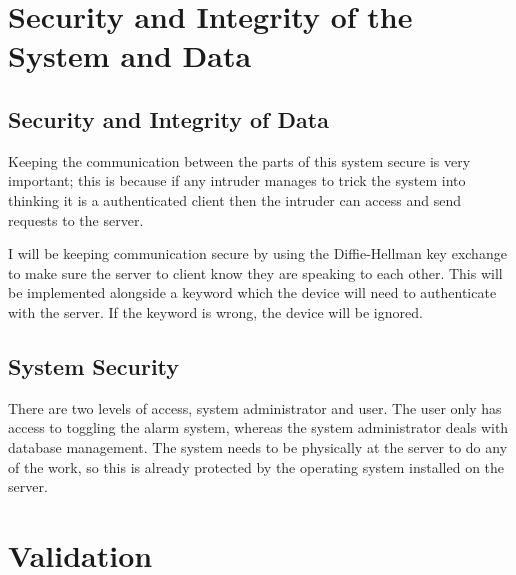 \documentclass[12pt,a4paper]{report}
\begin{document}
\bigskip

\section[Security and Integrity of the System and Data]{Security and Integrity of the System and Data}
\subsection[Security and Integrity of Data]{Security and Integrity of Data}
Keeping the communication between the parts of this system secure is very important; this is because if any intruder manages to trick the system into thinking it is a authenticated client then the intruder can access and send requests to the server.

I will be keeping communication secure by using the Diffie-Hellman key exchange to make sure the server to client know they are speaking to each other. This will be implemented alongside a keyword which the device will need to authenticate with the server. If the keyword is wrong, the device will be ignored.

\subsection[System Security]{System Security}
There are two levels of access, system administrator and user. The user only has access to toggling the alarm system, whereas the system administrator deals with database management. The system needs to be physically at the server to do any of the work, so this is already protected by the operating system installed on the server.

\section[Validation]{Validation}

\end{document}
